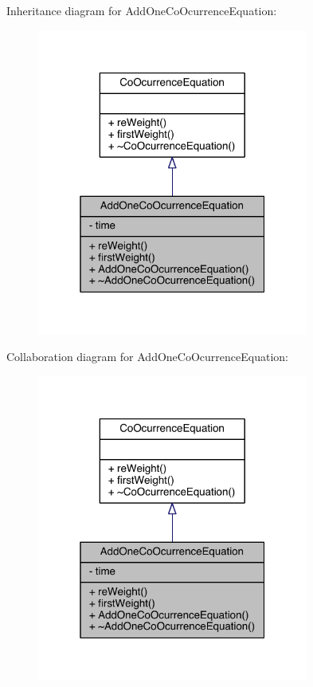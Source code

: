 Inheritance diagram for Add\+One\+Co\+Ocurrence\+Equation\+:
\nopagebreak
\begin{figure}[H]
\begin{center}
\leavevmode
\includegraphics[width=253pt]{class_add_one_co_ocurrence_equation__inherit__graph}
\end{center}
\end{figure}


Collaboration diagram for Add\+One\+Co\+Ocurrence\+Equation\+:
\nopagebreak
\begin{figure}[H]
\begin{center}
\leavevmode
\includegraphics[width=253pt]{class_add_one_co_ocurrence_equation__coll__graph}
\end{center}
\end{figure}


